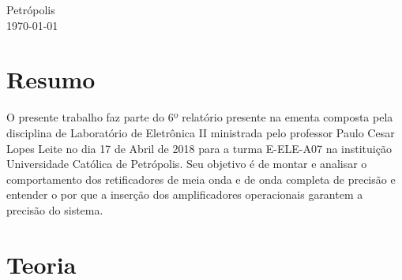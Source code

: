 \documentclass[11pt]{article}
\begin{document}
\begin{titlepage}
	
	
	\vfill\vfill\vfill %
	Petrópolis\\
	{\large\today} %
	
	
	 
	
	\vfill %
	
\end{titlepage}
\newpage


\section{Resumo}
O presente trabalho faz parte do 6º relatório presente na ementa composta pela disciplina de Laboratório de Eletrônica II ministrada pelo professor  Paulo Cesar Lopes Leite no dia 17 de Abril de 2018 
para a turma E-ELE-A07 na instituição 
Universidade Católica de Petrópolis. Seu objetivo é de montar e analisar o comportamento dos retificadores de meia onda e de onda completa de precisão e entender o por que a inserção dos amplificadores operacionais garantem a precisão do sistema.
\section{Teoria}
\end{document}
